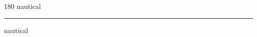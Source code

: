 
\begin{frame}
\begin{center}
\begin{turn}{180}
{\fontsize{2.5cm}{1em}\selectfont nautical}
\end{turn}
\vspace{1em}\par  
\hrule
\vspace{1em}\par  
{\fontsize{2.5cm}{1em}\selectfont nautical}
\end{center}
\end{frame}
